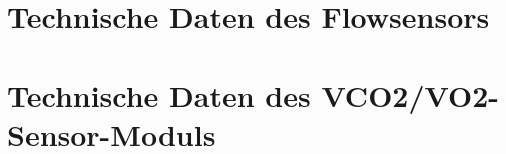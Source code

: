\chapter{Technische Daten des Flowsensors}


\chapter{Technische Daten des \acs{VCO2}/\acs{VO2}-Sensor-Moduls}

